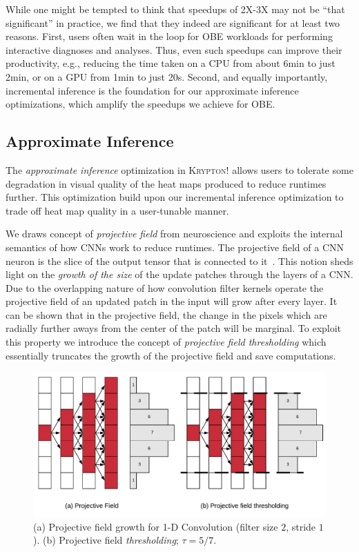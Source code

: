 \documentclass{vldb}
\newcommand{\system}{\textsc{Krypton}}
\begin{document}
While one might be tempted to think that speedups of 2X-3X may not be ``that significant'' in practice, we find that they indeed are significant for at least two reasons.
First, users often wait in the loop for OBE workloads for performing interactive diagnoses and analyses.
Thus, even such speedups can improve their productivity, e.g., reducing the time taken on a CPU from about 6min to just 2min, or on a GPU from
1min to just 20s.
Second, and equally importantly, incremental inference is the foundation for our approximate inference optimizations, which amplify the speedups we achieve for OBE.

\subsection{Approximate Inference}
The \textit{approximate inference} optimization in \system! allows users to tolerate some degradation in visual quality of the heat maps produced to reduce runtimes further.
This optimization build upon our incremental inference optimization to trade off heat map quality in a user-tunable manner.

We draws concept of \textit{projective field} from neuroscience and exploits the internal semantics of how CNNs work to reduce runtimes.
The projective field of a CNN neuron is the slice of the output tensor that is connected to it~\cite{basiccnnoperations}.
This notion sheds light on the \textit{growth of the size} of the update patches through the layers of a CNN.
Due to the overlapping nature of how convolution filter kernels operate the projective field of an updated patch in the input will grow after every layer.
It can be shown that in the projective field, the change in the pixels which are radially further aways from the center of the patch will be marginal.
To exploit this property we introduce the concept of \textit{projective field thresholding} which essentially truncates the growth of the projective field and save computations.

\begin{figure}[t]
\includegraphics[width=\columnwidth]{images/pf_truncate}
\caption{(a) Projective field growth for 1-D Convolution (filter size $2$, stride $1$). (b) Projective field \textit{thresholding}; $\tau = 5/7$.}
\label{fig:pf_truncate}
\end{figure}
\end{document}
